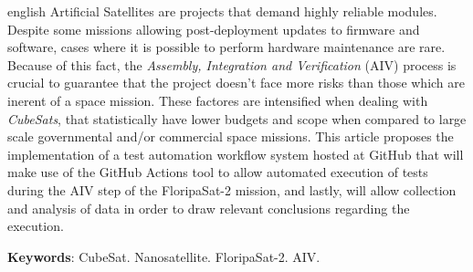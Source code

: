 \begin{resumo}[Abstract]
	\SingleSpacing
	\begin{otherlanguage*}{english}
	    Artificial Satellites are projects that demand highly reliable modules.
		Despite some missions allowing post-deployment updates to firmware and software, cases where it is
		possible to perform hardware maintenance are rare. Because of this fact, the
		\textit{Assembly, Integration and Verification} (AIV) process is crucial to guarantee that the
		project doesn't face more risks than those which are inerent of a space mission.
		These factores are intensified when dealing with \textit{CubeSats}, that statistically have lower
		budgets and scope when compared to large scale governmental and/or commercial space missions.
		This article proposes the implementation of a test automation workflow system hosted at GitHub that
		will make use of the GitHub Actions tool to allow automated execution of tests during the AIV step
		of the FloripaSat-2 mission, and lastly, will allow collection and analysis of data in order to draw
		relevant conclusions regarding the execution.


		\textbf{Keywords}: CubeSat. Nanosatellite. FloripaSat-2. AIV.
	\end{otherlanguage*}
\end{resumo}
%
%
%

{%
	\hypersetup{hidelinks}
	\listoffigures*
	\cleardoublepage

	\listofquadros*
	\cleardoublepage



	

% 	

	\tableofcontents*
	\cleardoublepage

}%
